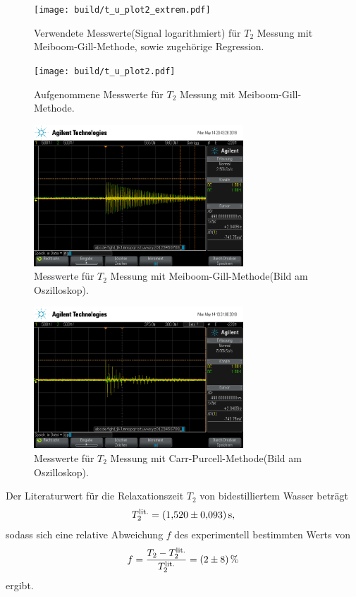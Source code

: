 \begin{figure}[hhh]
  \centering
  \texttt{[image: build/t\_u\_plot2\_extrem.pdf]}
  \caption{Verwendete Messwerte(Signal logarithmiert) für $T_{2}$ Messung mit Meiboom-Gill-Methode, sowie zugehörige Regression.}
  \label{fig:t2_gesamt}
\end{figure}


\begin{figure}[hhh]
  \centering
  \texttt{[image: build/t\_u\_plot2.pdf]}
  \caption{Aufgenommene Messwerte für $T_{2}$ Messung mit Meiboom-Gill-Methode.}
  \label{fig:t2_plot}
\end{figure}


\begin{figure}[hhh]
  \centering
  \includegraphics[width=0.7\textwidth]{mg.png}
  \caption{Messwerte für $T_{2}$ Messung mit Meiboom-Gill-Methode(Bild am Oszilloskop).}
  \label{fig:meiboomgill}
\end{figure}

\begin{figure}[hhh]
  \centering
  \includegraphics[width=0.7\textwidth]{cp.png}
  \caption{Messwerte für $T_{2}$ Messung mit Carr-Purcell-Methode(Bild am Oszilloskop).}
  \label{fig:carrpucell}
\end{figure}


Der Literaturwert\cite{litwerte} für die Relaxationszeit $T_{2}$ von bidestilliertem Wasser
beträgt
\begin{align*}
  T_{2}^\text{lit.} = \SI{1.52+-0.093}{\second},
\end{align*}
sodass sich eine relative Abweichung $f$ des experimentell bestimmten Werts
von
\begin{align*}
  f = \frac{T_{2} - T_{2}^\text{lit.}}{T_{2}^\text{lit.}} = \SI{2+-8}{\percent}
\end{align*}
ergibt.


